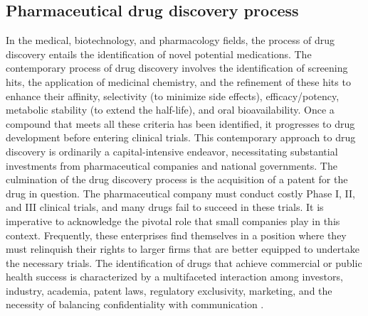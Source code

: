 \subsection{Pharmaceutical drug discovery process}
In the medical, biotechnology, and pharmacology fields, the process of drug discovery entails the identification of novel potential medications. The contemporary process of drug discovery involves the identification of screening hits, the application of medicinal chemistry, and the refinement of these hits to enhance their affinity, selectivity (to minimize side effects), efficacy/potency, metabolic stability (to extend the half-life), and oral bioavailability. Once a compound that meets all these criteria has been identified, it progresses to drug development before entering clinical trials. This contemporary approach to drug discovery is ordinarily a capital-intensive endeavor, necessitating substantial investments from pharmaceutical companies and national governments. The culmination of the drug discovery process is the acquisition of a patent for the drug in question. The pharmaceutical company must conduct costly Phase I, II, and III clinical trials, and many drugs fail to succeed in these trials. It is imperative to acknowledge the pivotal role that small companies play in this context. Frequently, these enterprises find themselves in a position where they must relinquish their rights to larger firms that are better equipped to undertake the necessary trials. The identification of drugs that achieve commercial or public health success is characterized by a multifaceted interaction among investors, industry, academia, patent laws, regulatory exclusivity, marketing, and the necessity of balancing confidentiality with communication \cite{Helleboid2014}.

